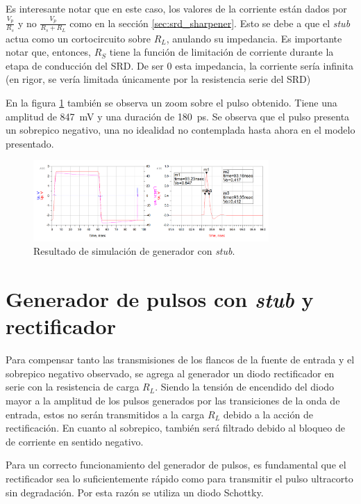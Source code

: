 Es interesante notar que en este caso, los valores de la corriente están dados
por $\frac{V_p}{R_s}$ y no $\frac{V_p}{R_s+R_L}$ como en la sección
\ref{sec:srd_sharpener}. Esto se debe a que el \textit{stub} actua como un
cortocircuito sobre $R_L$, anulando su impedancia. Es importante notar que,
entonces, $R_S$ tiene la función de limitación de corriente durante la etapa
de conducción del SRD. De ser $0$ esta impedancia, la corriente sería infinita
(en rigor, se vería limitada únicamente por la resistencia serie del SRD)

En la figura \ref{fig:stub_generator_sim_result} también se observa un zoom sobre el
pulso obtenido. Tiene una amplitud de \qty{847}{\milli\volt} y una duración de
\qty{180}{\pico\second}. Se observa que el pulso presenta un sobrepico negativo,
una no idealidad no contemplada hasta ahora en el modelo presentado.

\begin{figure}[t!]
    \centering
    \includegraphics[width=0.8\textwidth]{images/stub_generator_sim_result.png}
    \caption{Resultado de simulación de generador con \textit{stub}.}
    \label{fig:stub_generator_sim_result}
\end{figure}

\section{Generador de pulsos con \textit{stub} y rectificador}

Para compensar tanto las transmisiones de los flancos de la fuente de entrada y
el sobrepico negativo observado, se agrega al generador un diodo rectificador en
serie con la resistencia de carga $R_L$. Siendo la tensión de encendido del
diodo mayor a la amplitud de los pulsos generados por las transiciones de la
onda de entrada, estos no serán transmitidos a la carga $R_L$ debido a la acción
de rectificación. En cuanto al sobrepico, también será filtrado debido al
bloqueo de de corriente en sentido negativo.

Para un correcto funcionamiento del generador de pulsos, es fundamental que el
rectificador sea lo suficientemente rápido como para transmitir el pulso
ultracorto sin degradación. Por esta razón se utiliza un diodo Schottky.


